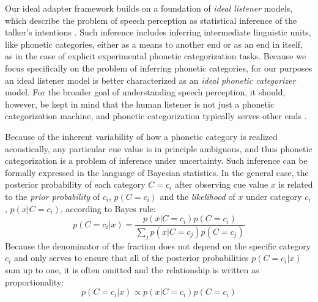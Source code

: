 Our ideal adapter framework builds on a foundation of {\em ideal listener} models, which describe the problem of speech perception as statistical inference of the talker's intentions \autocite{Clayards2008,Feldman2009a,Norris2008,Sonderegger2010}. Such inference includes inferring intermediate linguistic units, like phonetic categories, either as a means to another end or as an end in itself, as in the case of explicit experimental phonetic categorization tasks.  Because we focus specifically on the problem of inferring phonetic categories, for our purposes an ideal listener model is better characterized as an {\em ideal phonetic categorizer} model. For the broader goal of understanding speech perception, it should, however, be kept in mind that the human listener is not just a phonetic categorization machine, and phonetic categorization typically serves other ends \autocites[such as lexical access,][]{Norris2008}[or even the successful inference of communicative intentions][]{Jaeger2013b}.

Because of the inherent variability of how a phonetic category is realized acoustically, any particular cue value is in principle ambiguous, and thus phonetic categorization is a problem of inference under uncertainty.  Such inference can be formally expressed in the language of Bayesian statistics.  In the general case, the posterior probability of each category $C=c_i$ after observing cue value $x$ is related to the \emph{prior probability} of $c_i$,  $p(C=c_i)$ and the \emph{likelihood} of $x$ under category $c_i$, $p(x|C=c_i)$, according to Bayes rule:
\begin{equation*}
  p(C=c_i | x) = \frac{p(x | C=c_i) p(C=c_i)}{\sum_j p(x|C=c_j) p(C=c_j)}  %
\end{equation*}
Because the denominator of the fraction does not depend on the specific category $c_i$ and only serves to ensure that all of the posterior probabilities $p(C=c_i | x)$ sum up to one, it is often omitted and the relationship is written as proportionality:
\begin{equation*}
  p(C=c_i | x) \propto p(x | C=c_i) p(C=c_i)
\end{equation*}

